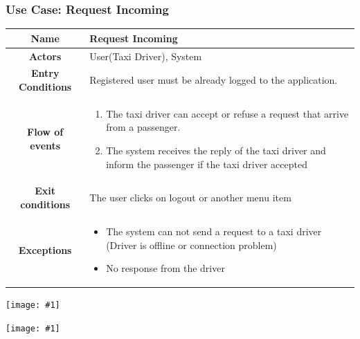 \documentclass[11pt, a4paper,titlepage]{article}
\newcommand{\image}[1]{
	\begin{center}
		\noindent \texttt{[image: \#1]}
	\end{center}
	}
\begin{document}
\subsubsection{Use Case: Request Incoming}
		\begin{tabularx}{\textwidth}{| c | X |}
			\hline
			\textbf{Name} & 
			Request Incoming
			\\
			\hline
			\textbf{Actors} & 
			User(Taxi Driver), System
			\\
			\hline
			\textbf{Entry Conditions} &
			Registered user must be already logged to the application. 
			\\
			\hline
			\textbf{Flow of events} & 
			\begin{enumerate}
				\item The taxi driver can accept or refuse a request that arrive from a passenger. 
				\item The system receives the reply of the taxi driver and inform the passenger if the taxi driver accepted
				
			\end{enumerate}						
			\\
			\hline
			\textbf{Exit conditions} & 
			The user clicks on logout or another menu item
			\\
			\hline
			\textbf{Exceptions} & 
			\begin{itemize}
				\item The system can not send a request to a taxi driver (Driver is offline or connection problem)
				\item No response from the driver				
			\end{itemize} 
			\\
			\hline		
		\end{tabularx}
		\image{usecase_request_incoming.png}
		\image{diagram_sequence_request_incoming.png}
		\newpage
\end{document}
